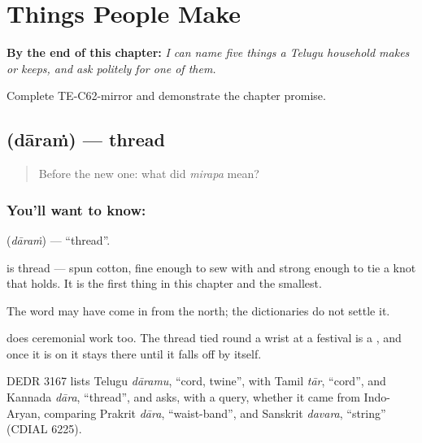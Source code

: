 
\chapter{Things People Make}
\label{ch:te-made-things}

\begin{chapteropening}
\textbf{By the end of this chapter:} \emph{I can name five things a Telugu household makes or keeps, and ask politely for one of them.}

Complete TE-C62-mirror and demonstrate the chapter promise.
\end{chapteropening}

\section[\texorpdfstring{\te{దారం} (dāraṁ)}{దారం (dāraṁ)}]{ (dāraṁ) — thread}

\label{lesson:TE-C62-thread}



\begin{quote}
Before the new one: what did \emph{mirapa} mean?
\end{quote}

\subsection*{You'll want to know: }
\textbf{} (\emph{dāraṁ}) — \textquotedblleft{}thread\textquotedblright{}.

 is thread — spun cotton, fine enough to sew with and strong enough to tie a knot that holds. It is the first thing in this chapter and the smallest.

The word may have come in from the north; the dictionaries do not settle it.

 does ceremonial work too. The thread tied round a wrist at a festival is a , and once it is on it stays there until it falls off by itself.

DEDR 3167 lists Telugu \emph{dāramu}, \textquotedblleft{}cord, twine\textquotedblright{}, with Tamil \emph{tār}, \textquotedblleft{}cord\textquotedblright{}, and Kannada \emph{dāra}, \textquotedblleft{}thread\textquotedblright{}, and asks, with a query, whether it came from Indo-Aryan, comparing Prakrit \emph{dāra}, \textquotedblleft{}waist-band\textquotedblright{}, and Sanskrit \emph{davara}, \textquotedblleft{}string\textquotedblright{} (CDIAL 6225).

